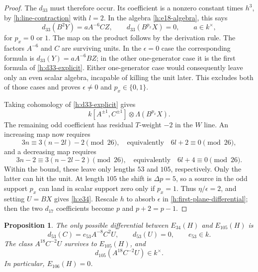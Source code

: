 \documentclass[11pt]{article}
\newtheorem{proposition}[theorem]{Proposition}
\theoremstyle{definition}
\theoremstyle{remark}
\numberwithin{equation}{section}
\begin{document}
\begin{proof}
The $d_{33}$ must therefore occur. Its coefficient is a nonzero
constant times $h^3$, by \eqref{h:line-contraction} with $l=2$.
In the algebra \eqref{h:e18-algebra}, this says
\begin{equation}
 \label{h:d33-explicit}
 d_{33}(B^2Y)=aA^{-6}CZ,\qquad
 d_{33}(B^{p_x}X)=0,\qquad a\in k^{\times},
\end{equation}
for $p_x=0$ or $1$. The map on the product follows by the derivation
rule. The factors $A^{-6}$ and $C$ are surviving units. In the
$\epsilon=0$ case the corresponding formula is
$d_{33}(Y)=aA^{-6}BZ$; in the other one-generator case it is the
first formula of \eqref{h:d33-explicit}. Either one-generator case
would consequently leave only an even scalar algebra, incapable of
killing the unit later. This excludes both of those cases and proves
$\epsilon\ne0$ and $p_x\in\{0,1\}$.

Taking cohomology of \eqref{h:d33-explicit} gives
\[
 k[A^{\pm1},C^{\pm1}]\otimes\Lambda(B^{p_x}X).
\]
The remaining odd coefficient has residual $T$-weight $-2$ in the
$W$ line. An increasing map now requires
\[
 3n\equiv3(n-2l)-2\pmod{26},
 \quad\text{equivalently}\quad 6l+2\equiv0\pmod{26},
\]
and a decreasing map requires
\[
 3n-2\equiv3(n-2l-2)\pmod{26},
 \quad\text{equivalently}\quad 6l+4\equiv0\pmod{26}.
\]
Within the bound, these leave only lengths $53$ and $105$,
respectively. Only the latter can hit the unit. At length $105$ the
shift is $\Delta p=5$, so a source in the odd support $p_x$ can
land in scalar support zero only if $p_x=1$. Thus
$\eta/\epsilon=2$, and setting $U=BX$ gives \eqref{h:e34}.
Rescale $h$ to absorb $\epsilon$ in
\eqref{h:first-plane-differential}; then the two $d_{17}$
coefficients become $p$ and $p+2=p-1$.
\end{proof}

\begin{proposition}
 \label{h:unit-death}
 The only possible differential between $E_{34}(H)$ and $E_{105}(H)$
 is
 \begin{equation}
 \label{h:d53}
 d_{53}(C)=e_{53}A^{-8}C^2U,\qquad d_{53}(U)=0,
 \qquad e_{53}\in k.
 \end{equation}
 The class $A^{18}C^{-2}U$ survives to $E_{105}(H)$, and
 \begin{equation}
 \label{h:d105}
 d_{105}(A^{18}C^{-2}U)\in k^{\times}.
 \end{equation}
 In particular, $E_{106}(H)=0$.
\end{proposition}
\end{document}

